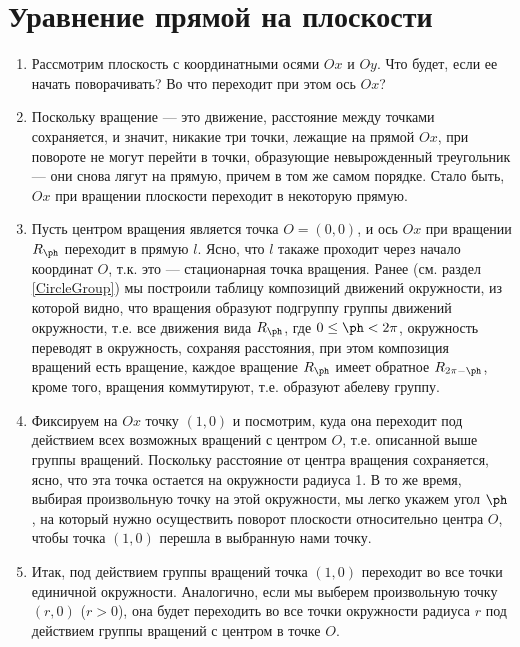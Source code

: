 
\section{Уравнение прямой на плоскости}


\begin{enumerate}
\item Рассмотрим плоскость с координатными осями $Ox$ и $Oy$. Что будет, если ее начать поворачивать? Во что переходит при этом ось $Ox$?
\item Поскольку вращение --- это движение, расстояние между точками сохраняется, и значит, никакие три точки, лежащие на прямой $Ox$, при повороте не могут перейти в точки, образующие невырожденный треугольник --- они снова лягут на прямую, причем в том же самом порядке. Стало быть, $Ox$ при вращении плоскости переходит в некоторую прямую.
\item Пусть центром вращения является точка $O=(0,0)$, и ось $Ox$ при вращении $R_\ph$ переходит в прямую $l$. Ясно, что $l$ такаже проходит через начало координат $O$, т.к. это --- стационарная точка вращения. Ранее (см. раздел \ref{CircleGroup}) мы построили таблицу композиций движений окружности, из которой видно, что вращения образуют подгруппу группы движений окружности, т.е. все движения вида $R_\ph$, где $0\le\ph<2\pi$, окружность переводят в окружность, сохраняя расстояния, при этом композиция вращений есть вращение, каждое вращение $R_\ph$ имеет обратное $R_{2\pi-\ph}$, кроме того, вращения коммутируют, т.е. образуют абелеву группу.
\item Фиксируем на $Ox$ точку $(1,0)$ и посмотрим, куда она переходит под действием всех возможных вращений с центром $O$, т.е. описанной выше группы вращений. Поскольку расстояние от центра вращения сохраняется, ясно, что эта точка остается на окружности радиуса 1. В то же время, выбирая произвольную точку на этой окружности, мы легко укажем угол $\ph$, на который нужно осуществить поворот плоскости относительно центра $O$, чтобы точка $(1,0)$ перешла в выбранную нами точку.
\item Итак, под действием группы вращений точка $(1,0)$ переходит во все точки единичной окружности. Аналогично, если мы выберем произвольную точку $(r,0)$ ($r>0$), она будет переходить во все точки окружности радиуса $r$ под действием группы вращений с центром в точке $O$.

\end{enumerate}

